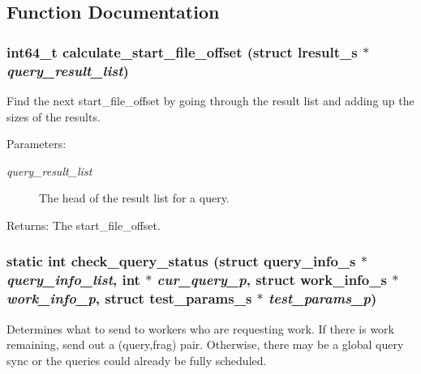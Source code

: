 \subsection{Function Documentation}
\subsubsection{\setlength{\rightskip}{0pt plus 5cm}int64\_\-t calculate\_\-start\_\-file\_\-offset (struct \bf{lresult\_\-s} $\ast$ {\em query\_\-result\_\-list})}\label{master__help_8c_cd2ffec0ba4d23b5d523d264c2b3dd4f}


Find the next start\_\-file\_\-offset by going through the result list and adding up the sizes of the results.

\begin{Desc}
\item[Parameters:]
\begin{description}
\item[{\em query\_\-result\_\-list}]The head of the result list for a query. \end{description}
\end{Desc}
\begin{Desc}
\item[Returns:]The start\_\-file\_\-offset. \end{Desc}
\subsubsection{\setlength{\rightskip}{0pt plus 5cm}static int check\_\-query\_\-status (struct \bf{query\_\-info\_\-s} $\ast$ {\em query\_\-info\_\-list}, int $\ast$ {\em cur\_\-query\_\-p}, struct \bf{work\_\-info\_\-s} $\ast$ {\em work\_\-info\_\-p}, struct \bf{test\_\-params\_\-s} $\ast$ {\em test\_\-params\_\-p})\hspace{0.3cm}{\tt  [static]}}\label{master__help_8c_6bef6ce044339a1ac0e10d17c991eb5a}


Determines what to send to workers who are requesting work. If there is work remaining, send out a (query,frag) pair. Otherwise, there may be a global query sync or the queries could already be fully scheduled.

